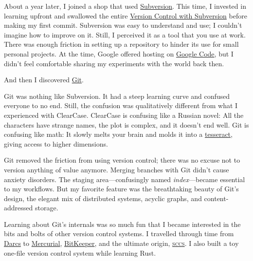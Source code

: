 \documentclass{article}
\begin{document}
About a year later, I joined a shop that used \href{https://subversion.apache.org/}{Subversion}.
This time, I invested in learning upfront and swallowed the entire \href{https://svnbook.red-bean.com/}{Version Control with Subversion} before making my first commit.
Subversion was easy to understand and use; I couldn't imagine how to improve on it.
Still, I perceived it as a tool that you use at work.
There was enough friction in setting up a repository to hinder its use for small personal projects.
At the time, Google offered hosting on \href{https://code.google.com/}{Google Code}, but I didn't feel comfortable sharing my experiments with the world back then.

And then I discovered \href{https://git-scm.com/}{Git}.

Git was nothing like Subversion.
It had a steep learning curve and confused everyone to no end.
Still, the confusion was qualitatively different from what I experienced with ClearCase.
ClearCase is confusing like a Russian novel: All the characters have strange names, the plot is complex, and it doesn't end well.
Git is confusing like math: It slowly melts your brain and molds it into a \href{https://en.wikipedia.org/wiki/Tesseract}{tesseract}, giving access to higher dimensions.

Git removed the friction from using version control; there was no excuse not to version anything of value anymore.
Merging branches with Git didn't cause anxiety disorders.
The staging area---confusingly named \emph{index}---became essential to my workflows.
But my favorite feature was the breathtaking beauty of Git's design, the elegant mix of distributed systems, acyclic graphs, and content-addressed storage.

Learning about Git's internals was so much fun that I became interested in the bits and bolts of other version control systems.
I travelled through time from \href{https://darcs.net/}{Darcs} to \href{https://www.mercurial-scm.org/}{Mercurial}, \href{https://www.bitkeeper.org/}{BitKeeper}, and the ultimate origin, \href{https://en.wikipedia.org/wiki/Source_Code_Control_System}{\textsc{sccs}}.
I also built a toy one-file version control system while learning Rust.
\end{document}
